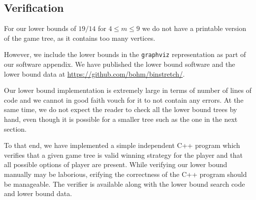 \subsection{Verification}

For our lower bounds of $19/14$ for $4 \le m \le 9$ we do not have a
printable version of the game tree, as it contains too many vertices.

However, we include the lower bounds in the \texttt{graphviz}
representation as part of our software appendix. We have published the
lower bound software and the lower bound data at
\url{https://github.com/bohm/binstretch/}.

Our lower bound implementation is extremely large in terms of number
of lines of code and we cannot in good faith vouch for it to not
contain any errors. At the same time, we do not expect the reader
to check all the lower bound trees by hand, even though it is possible
for a smaller tree such as the one in the next section.

To that end, we have implemented a simple independent C++ program
which verifies that a given game tree is valid winning strategy for
the player \adversary and that all possible options of player \algo
are present. While verifying our lower bound manually may be
laborious, erifying the correctness of the C++ program should be
manageable. The verifier is available along with the lower bound
search code and lower bound data.